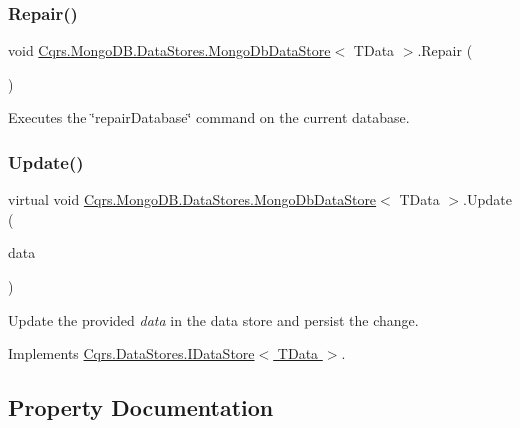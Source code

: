 \subsubsection{\texorpdfstring{Repair()}{Repair()}}
{\footnotesize\ttfamily void \hyperlink{classCqrs_1_1MongoDB_1_1DataStores_1_1MongoDbDataStore}{Cqrs.\+Mongo\+D\+B.\+Data\+Stores.\+Mongo\+Db\+Data\+Store}$<$ T\+Data $>$.Repair (\begin{DoxyParamCaption}{ }\end{DoxyParamCaption})}



Executes the \char`\"{}repair\+Database\char`\"{} command on the current database. 

\mbox{\label{classCqrs_1_1MongoDB_1_1DataStores_1_1MongoDbDataStore_af86a3df56e2df92fb9ef880ff4fa5f16_af86a3df56e2df92fb9ef880ff4fa5f16}} 
\subsubsection{\texorpdfstring{Update()}{Update()}}
{\footnotesize\ttfamily virtual void \hyperlink{classCqrs_1_1MongoDB_1_1DataStores_1_1MongoDbDataStore}{Cqrs.\+Mongo\+D\+B.\+Data\+Stores.\+Mongo\+Db\+Data\+Store}$<$ T\+Data $>$.Update (\begin{DoxyParamCaption}\item[{T\+Data}]{data }\end{DoxyParamCaption})\hspace{0.3cm}{\ttfamily [virtual]}}



Update the provided {\itshape data}  in the data store and persist the change. 



Implements \hyperlink{interfaceCqrs_1_1DataStores_1_1IDataStore_a6d5d4dd572de8db01ff0c48d37faefa7_a6d5d4dd572de8db01ff0c48d37faefa7}{Cqrs.\+Data\+Stores.\+I\+Data\+Store$<$ T\+Data $>$}.



\subsection{Property Documentation}
\mbox{\label{classCqrs_1_1MongoDB_1_1DataStores_1_1MongoDbDataStore_a54f5798a67d64a47e6acb15f378fb246_a54f5798a67d64a47e6acb15f378fb246}} 
